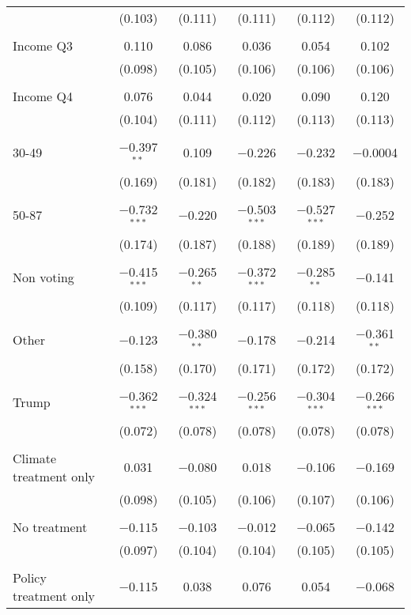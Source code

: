 \begin{tabular}{@{\extracolsep{5pt}}lccccc}
  & (0.103) & (0.111) & (0.111) & (0.112) & (0.112) \\ 
  & & & & & \\ 
 Income Q3 & 0.110 & 0.086 & 0.036 & 0.054 & 0.102 \\ 
  & (0.098) & (0.105) & (0.106) & (0.106) & (0.106) \\ 
  & & & & & \\ 
 Income Q4 & 0.076 & 0.044 & 0.020 & 0.090 & 0.120 \\ 
  & (0.104) & (0.111) & (0.112) & (0.113) & (0.113) \\ 
  & & & & & \\ 
 30-49 & $-$0.397$^{**}$ & 0.109 & $-$0.226 & $-$0.232 & $-$0.0004 \\ 
  & (0.169) & (0.181) & (0.182) & (0.183) & (0.183) \\ 
  & & & & & \\ 
 50-87 & $-$0.732$^{***}$ & $-$0.220 & $-$0.503$^{***}$ & $-$0.527$^{***}$ & $-$0.252 \\ 
  & (0.174) & (0.187) & (0.188) & (0.189) & (0.189) \\ 
  & & & & & \\ 
 Non voting & $-$0.415$^{***}$ & $-$0.265$^{**}$ & $-$0.372$^{***}$ & $-$0.285$^{**}$ & $-$0.141 \\ 
  & (0.109) & (0.117) & (0.117) & (0.118) & (0.118) \\ 
  & & & & & \\ 
 Other & $-$0.123 & $-$0.380$^{**}$ & $-$0.178 & $-$0.214 & $-$0.361$^{**}$ \\ 
  & (0.158) & (0.170) & (0.171) & (0.172) & (0.172) \\ 
  & & & & & \\ 
 Trump & $-$0.362$^{***}$ & $-$0.324$^{***}$ & $-$0.256$^{***}$ & $-$0.304$^{***}$ & $-$0.266$^{***}$ \\ 
  & (0.072) & (0.078) & (0.078) & (0.078) & (0.078) \\ 
  & & & & & \\ 
 Climate treatment only & 0.031 & $-$0.080 & 0.018 & $-$0.106 & $-$0.169 \\ 
  & (0.098) & (0.105) & (0.106) & (0.107) & (0.106) \\ 
  & & & & & \\ 
 No treatment & $-$0.115 & $-$0.103 & $-$0.012 & $-$0.065 & $-$0.142 \\ 
  & (0.097) & (0.104) & (0.104) & (0.105) & (0.105) \\ 
  & & & & & \\ 
 Policy treatment only & $-$0.115 & 0.038 & 0.076 & 0.054 & $-$0.068 \\ 

\end{tabular}
